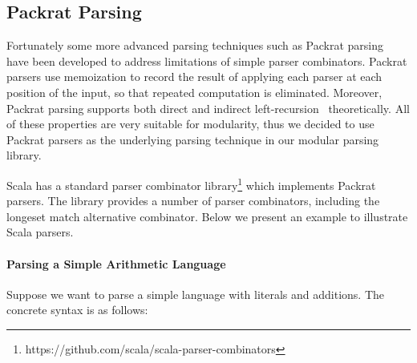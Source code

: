 \subsection{Packrat Parsing}\label{subsec:packratparsing}
Fortunately some more advanced parsing techniques such as Packrat parsing~\cite{Ford2002} have been developed to address limitations of simple parser combinators. Packrat parsers use memoization to record the result of applying each parser at each position of the input, so that repeated computation is eliminated.  Moreover, Packrat parsing supports both direct and indirect left-recursion~\cite{warth2008} theoretically. All of these properties are very suitable for modularity, thus we decided to use Packrat parsers as the underlying parsing technique in our modular parsing library.
\begin{comment}
It is worth mentioning that the choice of parser combinators will not
affect the other parts of our library. One can choose other parser
combinators like Parsec, in cases that the performance and supporting
of left-recursion are not major concerns. A different library can even build a new
\name with fancy features or higher efficiency.
\end{comment}
Scala has a standard parser combinator library\footnote{https://github.com/scala/scala-parser-combinators}
\cite{moors2008parser} which implements Packrat parsers.
The library provides a number of parser combinators, including the longeset match alternative combinator.
Below we present an example to illustrate Scala parsers.
%

\paragraph{Parsing a Simple Arithmetic Language}
Suppose we want to parse a simple language with literals and
additions. The concrete syntax is as follows:


